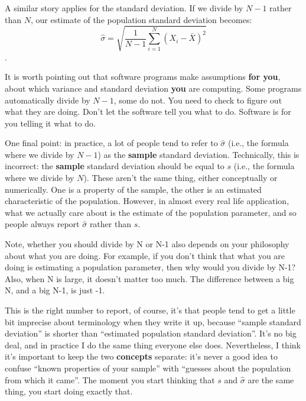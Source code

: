 \documentclass[
]{book}
\begin{document}
A similar story applies for the standard deviation. If we divide by \(N-1\) rather than \(N\), our estimate of the population standard deviation becomes: \[\hat\sigma = \sqrt{\frac{1}{N-1} \sum_{i=1}^N (X_i - \bar{X})^2}\].

It is worth pointing out that software programs make assumptions \textbf{for you}, about which variance and standard deviation \textbf{you} are computing. Some programs automatically divide by \(N-1\), some do not. You need to check to figure out what they are doing. Don't let the software tell you what to do. Software is for you telling it what to do.

One final point: in practice, a lot of people tend to refer to \(\hat{\sigma}\) (i.e., the formula where we divide by \(N-1\)) as the \textbf{sample} standard deviation. Technically, this is incorrect: the \textbf{sample} standard deviation should be equal to \(s\) (i.e., the formula where we divide by \(N\)). These aren't the same thing, either conceptually or numerically. One is a property of the sample, the other is an estimated characteristic of the population. However, in almost every real life application, what we actually care about is the estimate of the population parameter, and so people always report \(\hat\sigma\) rather than \(s\).

\begin{marginnote}

Note, whether you should divide by N or N-1 also depends on your philosophy about what you are doing. For example, if you don't think that what you are doing is estimating a population parameter, then why would you divide by N-1? Also, when N is large, it doesn't matter too much. The difference between a big N, and a big N-1, is just -1.

\end{marginnote}

This is the right number to report, of course, it's that people tend to get a little bit imprecise about terminology when they write it up, because ``sample standard deviation'' is shorter than ``estimated population standard deviation''. It's no big deal, and in practice I do the same thing everyone else does. Nevertheless, I think it's important to keep the two \textbf{concepts} separate: it's never a good idea to confuse ``known properties of your sample'' with ``guesses about the population from which it came''. The moment you start thinking that \(s\) and \(\hat\sigma\) are the same thing, you start doing exactly that.
\end{document}
